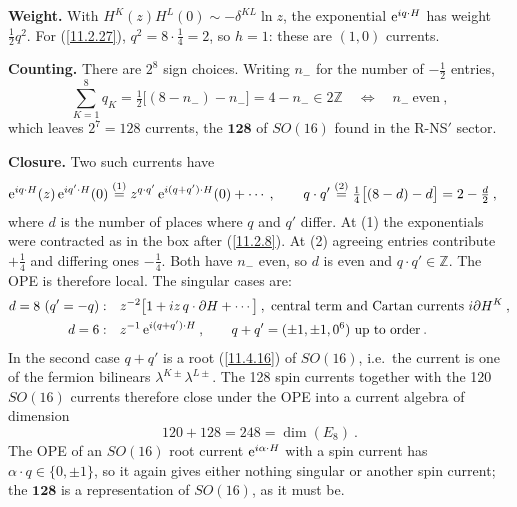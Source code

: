 \begin{tcolorbox}[breakable]
	\begin{remark}
		\textbf{Weight.} With $H^{K}(z)H^{L}(0)\sim-\delta^{KL}\ln z$, the exponential $\mathrm{e}^{i q\cdot H}$ has weight $\frac{1}{2}q^{2}$. For (\ref{11.2.27}), $q^{2}=8\cdot\frac{1}{4}=2$, so $h=1$: these are $(1,0)$ currents.

		\textbf{Counting.} There are $2^{8}$ sign choices. Writing $n_{-}$ for the number of $-\frac{1}{2}$ entries,
		\begin{equation*}
			\sum_{K=1}^{8}q_{K}=\tfrac{1}{2}\bigl[(8-n_{-})-n_{-}\bigr]=4-n_{-}\in2\mathds{Z}\quad\Longleftrightarrow\quad n_{-}\ \text{even}\:,
		\end{equation*}
		which leaves $2^{7}=128$ currents, the $\mathbf{128}$ of $SO(16)$ found in the R-NS$'$ sector.

		\textbf{Closure.} Two such currents have
		\begin{align*}
			\mathrm{e}^{i q\cdot H}(z)\,\mathrm{e}^{i q'\cdot H}(0)&\overset{(1)}{=}z^{q\cdot q'}\,\mathrm{e}^{i(q+q')\cdot H}(0)+\cdots\:,\qquad
			q\cdot q'\overset{(2)}{=}\tfrac{1}{4}\bigl[(8-d)-d\bigr]=2-\tfrac{d}{2}\:,
		\end{align*}
		where $d$ is the number of places where $q$ and $q'$ differ. At (1) the exponentials were contracted as in the box after (\ref{11.2.8}). At (2) agreeing entries contribute $+\frac{1}{4}$ and differing ones $-\frac{1}{4}$. Both have $n_{-}$ even, so $d$ is even and $q\cdot q'\in\mathds{Z}$. The OPE is therefore local. The singular cases are:
		\begin{align*}
			d=8\ (q'=-q):&\quad z^{-2}\bigl[1+i z\,q\cdot\partial H+\cdots\bigr]\:,\ \text{central term and Cartan currents }i\partial H^{K}\:,\\
			d=6:&\quad z^{-1}\,\mathrm{e}^{i(q+q')\cdot H}\:,\qquad q+q'=(\pm1,\pm1,0^{6})\ \text{up to order}\:.
		\end{align*}
		In the second case $q+q'$ is a root (\ref{11.4.16}) of $SO(16)$, i.e.\ the current is one of the fermion bilinears $\lambda^{K\pm}\lambda^{L\pm}$. The 128 spin currents together with the 120 $SO(16)$ currents therefore close under the OPE into a current algebra of dimension
		\begin{equation*}
			120+128=248=\operatorname{dim}(E_{8})\:.
		\end{equation*}
		The OPE of an $SO(16)$ root current $\mathrm{e}^{i\alpha\cdot H}$ with a spin current has $\alpha\cdot q\in\{0,\pm1\}$, so it again gives either nothing singular or another spin current; the $\mathbf{128}$ is a representation of $SO(16)$, as it must be.
	\end{remark}
\end{tcolorbox}

